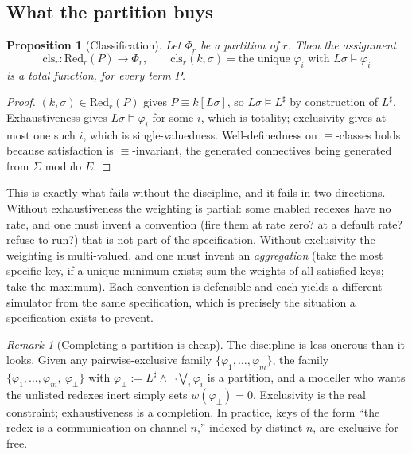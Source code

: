 \documentclass[11pt,a4paper]{article}
\theoremstyle{plain}
\newtheorem{proposition}[theorem]{Proposition}
\theoremstyle{definition}
\theoremstyle{remark}
\newtheorem{remark}[theorem]{Remark}
\newcommand{\Red}{\mathrm{Red}}
\newcommand{\wmap}{w}
\newcommand{\class}{\mathrm{cls}}
\begin{document}
\subsection{What the partition buys}
\label{sec:what-partition-buys}

\begin{proposition}[Classification]
\label{prop:classify}
Let $\Phi_r$ be a partition of $r$. Then the assignment
\[
\class_r : \Red_r(P) \longrightarrow \Phi_r,
\qquad
\class_r(k, \sigma) = \text{the unique } \varphi_i \text{ with } L\sigma \models \varphi_i
\]
is a total function, for every term $P$.
\end{proposition}

\begin{proof}
$(k,\sigma) \in \Red_r(P)$ gives $P \equiv k[L\sigma]$, so $L\sigma \models L^\sharp$ by
construction of $L^\sharp$. Exhaustiveness gives $L\sigma \models \varphi_i$ for some $i$, which is
totality; exclusivity gives at most one such $i$, which is single-valuedness. Well-definedness on
$\equiv$-classes holds because satisfaction is $\equiv$-invariant, the generated connectives being
generated from $\Sigma$ modulo $E$.
\end{proof}

This is exactly what fails without the discipline, and it fails in two directions. Without
exhaustiveness the weighting is partial: some enabled redexes have no rate, and one must invent a
convention (fire them at rate zero? at a default rate? refuse to run?) that is not part of the
specification. Without exclusivity the weighting is multi-valued, and one must invent an
\emph{aggregation} (take the most specific key, if a unique minimum exists; sum the weights of all
satisfied keys; take the maximum). Each convention is defensible and each yields a different
simulator from the same specification, which is precisely the situation a specification exists to
prevent.

\begin{remark}[Completing a partition is cheap]
\label{rem:default}
The discipline is less onerous than it looks. Given any pairwise-exclusive family
$\{\varphi_1,\dots,\varphi_m\}$, the family
$\{\varphi_1,\dots,\varphi_m,\ \varphi_\bot\}$ with
$\varphi_\bot := L^\sharp \wedge \neg\bigvee_i \varphi_i$ is a partition, and a modeller who wants
the unlisted redexes inert simply sets $\wmap(\varphi_\bot) = 0$. Exclusivity is the real
constraint; exhaustiveness is a completion. In practice, keys of the form ``the redex is a
communication on channel $n$,'' indexed by distinct $n$, are exclusive for free.
\end{remark}
\end{document}
